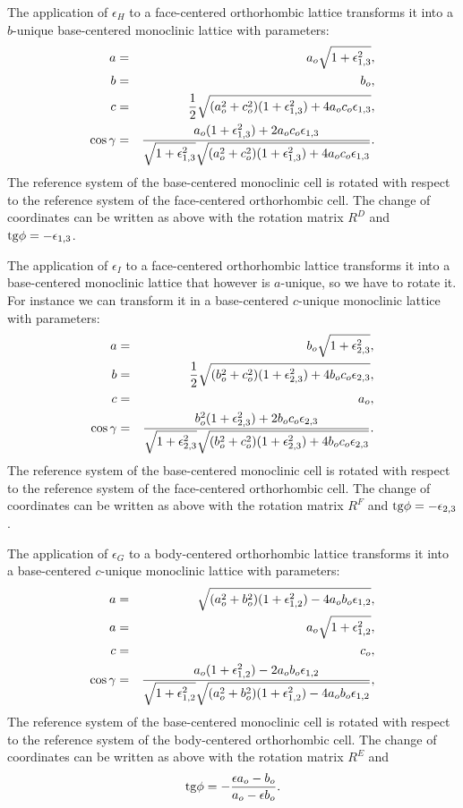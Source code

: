 \documentclass[12pt,a4paper,twoside]{report}
\begin{document}
The application of $\epsilon_H$ to a face-centered orthorhombic lattice
transforms it into a $b$-unique base-centered monoclinic lattice with
parameters:
\begin{eqnarray}
a&=&a_o \sqrt{1+\epsilon_{1,3}^2}, \\
b&=&b_o,  \\
c&=&{1\over 2} \sqrt{(a_o^2+c_o^2)(1+\epsilon_{1,3}^2)+4a_oc_o\epsilon_{1,3}}, \\
\cos\gamma &=& {a_o (1+\epsilon_{1,3}^2)+2a_oc_o\epsilon_{1,3} \over
\sqrt{1+\epsilon_{1,3}^2} \sqrt{(a_o^2+c_o^2)
(1+\epsilon_{1,3}^2)+4a_oc_o\epsilon_{1,3}}}. 
\end{eqnarray}
The reference system of the base-centered monoclinic cell is rotated 
with respect to the reference system of the face-centered orthorhombic cell. 
The change of coordinates can be written as above with the rotation matrix 
$R^D$ and ${\rm tg}\phi=-\epsilon_{1,3}$.

The application of $\epsilon_I$ to a face-centered orthorhombic lattice
transforms it into a base-centered monoclinic lattice that however is 
$a$-unique, so we have to rotate it. For instance we can transform it
in a base-centered $c$-unique monoclinic lattice with parameters:
\begin{eqnarray}
a&=&b_o \sqrt{1+\epsilon_{2,3}^2}, \\
b&=&{1\over 2} \sqrt{(b_o^2+c_o^2)(1+\epsilon_{2,3}^2)+4b_oc_o
\epsilon_{2,3}}, \\
c&=&a_o,  \\
\cos\gamma &=& {b_o^2 (1+\epsilon_{2,3}^2)+2b_oc_o\epsilon_{2,3} \over
\sqrt{1+\epsilon_{2,3}^2} \sqrt{(b_o^2+c_o^2)
(1+\epsilon_{2,3}^2)+4b_oc_o\epsilon_{2,3}}}. 
\end{eqnarray}
The reference system of the base-centered monoclinic cell is rotated 
with respect to the reference system of the face-centered orthorhombic cell. 
The change of coordinates can be written as above with the rotation matrix 
$R^F$ and 
${\rm tg}\phi=-\epsilon_{2,3}$.

The application of $\epsilon_G$ to a body-centered orthorhombic lattice
transforms it into a base-centered $c$-unique monoclinic lattice with 
parameters:
\begin{eqnarray}
a&=&\sqrt{(a_o^2+b_o^2)(1+\epsilon_{1,2}^2)-4a_ob_o\epsilon_{1,2}}, \\
a&=&a_o \sqrt{1+\epsilon_{1,2}^2}, \\
c&=&c_o,  \\
\cos\gamma &=& {a_o (1+\epsilon_{1,2}^2)-2a_ob_o\epsilon_{1,2} \over
\sqrt{1+\epsilon_{1,2}^2} \sqrt{(a_o^2+b_o^2)
(1+\epsilon_{1,2}^2)-4a_ob_o\epsilon_{1,2}}}, 
\end{eqnarray}
The reference system of the base-centered monoclinic cell is rotated 
with respect to the reference system of the body-centered orthorhombic cell. 
The change of coordinates can be written as above with the rotation matrix 
$R^E$ and
\begin{equation}
{\rm tg} \phi = -{ \epsilon a_o - b_o \over a_o - \epsilon b_o }.
\end{equation}
\end{document}
